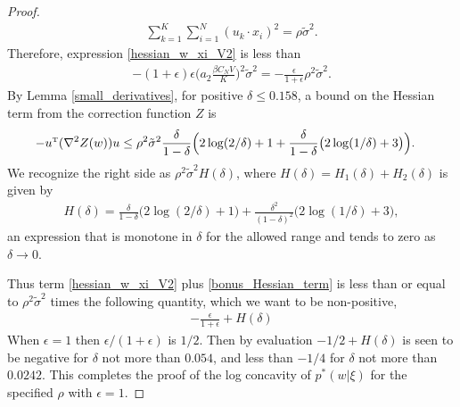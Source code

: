 \documentclass{article}
\numberwithin{equation}{section}
\theoremstyle{Lemma}
\theoremstyle{Corollary}
\theoremstyle{Theorem}
\theoremstyle{Remark}
\begin{document}
\begin{proof}
    \begin{align}
    \sum_{k=1}^{K}\sum_{i=1}^{N}(u_{k}\cdot x_{i})^{2} = \rho \tilde{\sigma}^{2}.
    \end{align}
    Therefore, expression \eqref{hessian_w_xi_V2} is less than
    \begin{align}
    -(1+\epsilon)\epsilon \Big(a_{2}\frac{\beta C_{N}V}{K}\Big)^{2}\tilde{\sigma}^{2} = -\frac{\epsilon}{1+\epsilon} \rho^2 \tilde{\sigma}^2.
    \end{align}
    By Lemma \ref{small_derivatives}, for positive $\delta \le 0.158$, a bound on the Hessian term from the correction function $Z$ is
    \begin{align}
        -u^{\text{\tiny{T}}}(\nabla^{2} Z(w))u& \leq \rho^{2}\tilde{\sigma}^{2} \frac{\delta}{1-\delta}\Big(2\log(2/\delta)+1 +\frac{\delta}{1-\delta}\big(2\log(1/\delta)+3\big) \Big).
    \end{align}
We recognize the right side as $\rho^2 \tilde{\sigma}^2 H(\delta)$, where $H(\delta)=H_1(\delta)+H_2(\delta)$ is given by
\begin{align}
H(\delta)=\frac{\delta}{1-\delta}\big(2\log(2/\delta)+1\big) +\frac{\delta^2}{(1-\delta)^2}\big(2\log(1/\delta)+3\big),
\end{align}
an expression that is monotone in $\delta$ for the allowed range and tends to zero as $\delta \to 0$.

    Thus term \eqref{hessian_w_xi_V2} plus \eqref{bonus_Hessian_term} is less than or equal to $\rho^2 \tilde{\sigma}^2$ times the following quantity, which we want to be non-positive,
    \begin{align}
-\frac{\epsilon}{1+\epsilon} + H(\delta)
\label{complex_rev_t3}
    \end{align}
When $\epsilon=1$ then $\epsilon/(1+\epsilon)$ is $1/2$.  Then by evaluation $-1/2 + H(\delta)$ is seen to be negative for $\delta$ not more than $0.054$, and less than $-1/4$ for $\delta$ not more than $0.0242$. This completes the proof of the log concavity of $p^*(w|\xi)$ for the specified $\rho$ with $\epsilon = 1$.


\end{proof}
\end{document}
